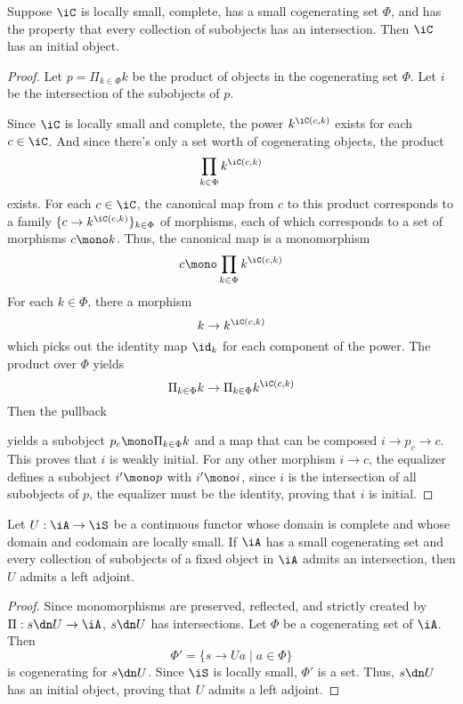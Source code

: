 \documentclass{amsart}
\begin{document}
\begin{lem}\label{lem:cogen-initial}
  Suppose $\iC$ is locally small, complete, has a small cogenerating set $\Phi$, and has the property that every collection of subobjects has an intersection.
  Then $\iC$ has an initial object.
\end{lem}
\begin{proof}
  Let $p = \Pi_{k \in \Phi}k$ be the product of objects in the cogenerating set $\Phi$.
  Let $i$ be the intersection of the subobjects of $p$.

  Since $\iC$ is locally small and complete, the power $k^{\iC(c,k)}$ exists for each $c \in \iC$.
  And since there's only a set worth of cogenerating objects, the product
  \[
    \prod_{k\in\Phi}k^{\iC(c,k)}
  \]
  exists.
  For each $c \in \iC$, the canonical map from $c$ to this product corresponds to a family $\{c \to k^{\iC(c,k)}\}_{k\in\Phi}$ of morphisms, each of which corresponds to a set of morphisms $c \mono k$.
  Thus, the canonical map is a monomorphism
  \[
    c \mono \prod_{k\in\Phi}k^{\iC(c,k)}
  \]
  For each $k \in \Phi$, there a morphism
  \[
    k \to k^{\iC(c,k)}
  \]
  which picks out the identity map $\id_{k}$ for each component of the power.
  The product over $\Phi$ yields
  \[
    \Pi_{k\in\Phi}k \to \Pi_{k\in\Phi}k^{\iC(c,k)}
  \]
  Then the pullback
  
  yields a subobject $p_{c} \mono \Pi_{k\in\Phi}k$ and a map that can be composed $i \to p_{c} \to c$.
  This proves that $i$ is weakly initial.
  For any other morphism $i \to c$, the equalizer defines a subobject $i' \mono p$ with $i' \mono i$, since $i$ is the intersection of all subobjects of $p$, the equalizer must be the identity, proving that $i$ is initial.
\end{proof}

\begin{thm}
  Let $U : \iA \to \iS$ be a continuous functor whose domain is complete and whose domain and codomain are locally small.
  If $\iA$ has a small cogenerating set and every collection of subobjects of a fixed object in $\iA$ admits an intersection, then $U$ admits a left adjoint.
\end{thm}
\begin{proof}
  Since monomorphisms are preserved, reflected, and strictly created by $\Pi : s \dn U \to \iA$, $s \dn U$ has intersections.
  Let $\Phi$ be a cogenerating set of $\iA$.
  Then
  \[
    \Phi' = \{s \to Ua \mid a \in \Phi\}
  \]
  is cogenerating for $s \dn U$.
  Since $\iS$ is locally small, $\Phi'$ is a set.
  Thus, $s \dn U$ has an initial object, proving that $U$ admits a left adjoint.
\end{proof}
\end{document}
